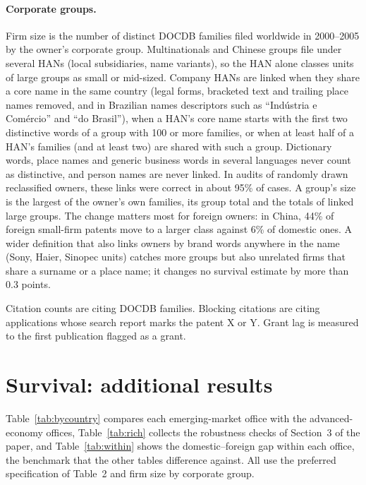 \paragraph{Corporate groups.} Firm size is the number of distinct DOCDB families filed worldwide in 2000--2005 by the
owner's corporate group. Multinationals and Chinese groups file under several HANs (local subsidiaries, name variants),
so the HAN alone classes units of large groups as small or mid-sized. Company HANs are linked when they share a core
name in the same country (legal forms, bracketed text and trailing place names removed, and in Brazilian names descriptors such as
``Ind\'ustria e Com\'ercio'' and ``do Brasil''), when a HAN's core name starts
with the first two distinctive words of a group with 100 or more families, or when at least half of a HAN's families
(and at least two) are shared with such a group. Dictionary words, place names and generic business words in several
languages never count as distinctive, and person names are never linked. In audits of randomly drawn reclassified
owners, these links were correct in about 95\% of cases. A group's size is the largest of the owner's own families,
its group total and the totals of linked large groups. The change matters most for foreign owners: in China, 44\% of
foreign small-firm patents move to a larger class against 6\% of domestic ones. A wider definition that also links
owners by brand words anywhere in the name (Sony, Haier, Sinopec units) catches more groups but also unrelated firms
that share a surname or a place name; it changes no survival estimate by more than 0.3 points.

Citation counts are citing DOCDB families. Blocking citations are citing applications
whose search report marks the patent X or Y. Grant lag is measured to the first publication flagged as a grant.

\section{Survival: additional results}\label{app:results}

Table~\ref{tab:bycountry} compares each emerging-market office with the advanced-economy offices,
Table~\ref{tab:rich} collects the robustness checks of Section~3 of the paper, and Table~\ref{tab:within} shows the
domestic--foreign gap within each office, the benchmark that the other tables difference against. All use the
preferred specification of Table~2 and firm size by corporate group.


